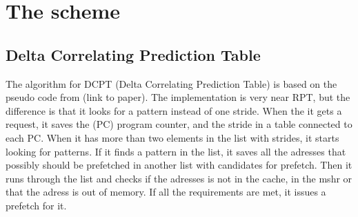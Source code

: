 \chapter{The scheme}
\section{Delta Correlating Prediction Table}
The algorithm for DCPT (Delta Correlating Prediction Table) is based on the pseudo code from (link to paper).
The implementation is very near RPT, but the difference is that it looks for a pattern instead of one stride.
When the it gets a request, it saves the (PC) program counter, and the stride in a table connected to each PC. When it has more than two elements in the list with strides, it starts looking for patterns.
If it finds a pattern in the list, it saves all the adresses that possibly should be prefetched in another list with candidates for prefetch.
Then it runs through the list and checks if the adresses is not in the cache, in the mshr or that the adress is out of memory. If all the requirements are met, it issues a prefetch for it.
